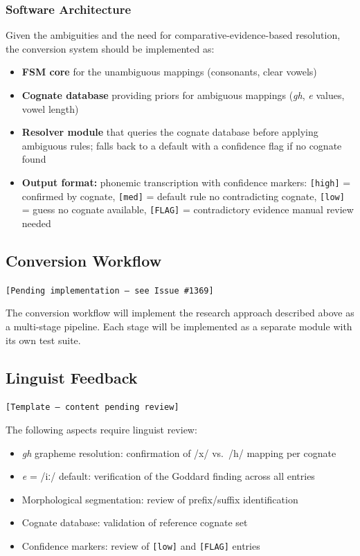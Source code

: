 \subsubsection{Software Architecture}

Given the ambiguities and the need for comparative-evidence-based resolution,
the conversion system should be implemented as:

\begin{itemize}
  \item \textbf{FSM core} for the unambiguous mappings (consonants, clear
    vowels)
  \item \textbf{Cognate database} providing priors for ambiguous mappings
    (\textit{gh}, \textit{e} values, vowel length)
  \item \textbf{Resolver module} that queries the cognate database before
    applying ambiguous rules; falls back to a default with a confidence flag
    if no cognate found
  \item \textbf{Output format:} phonemic transcription with confidence
    markers: \texttt{[high]} = confirmed by cognate, \texttt{[med]} = default
    rule no contradicting cognate, \texttt{[low]} = guess no cognate
    available, \texttt{[FLAG]} = contradictory evidence manual review needed
\end{itemize}

\subsection{Conversion Workflow}
\label{sec:1369-workflow}

\texttt{[Pending implementation --- see Issue \#1369]}

The conversion workflow will implement the research approach described above
as a multi-stage pipeline. Each stage will be implemented as a separate
module with its own test suite.

\subsection{Linguist Feedback}
\label{sec:1369-feedback}

\texttt{[Template --- content pending review]}

The following aspects require linguist review:

\begin{itemize}
  \item \textit{gh} grapheme resolution: confirmation of /x/ vs.\ /h/
    mapping per cognate
  \item \textit{e} = /iː/ default: verification of the Goddard finding
    across all entries
  \item Morphological segmentation: review of prefix/suffix identification
  \item Cognate database: validation of reference cognate set
  \item Confidence markers: review of \texttt{[low]} and \texttt{[FLAG]}
    entries
\end{itemize}

